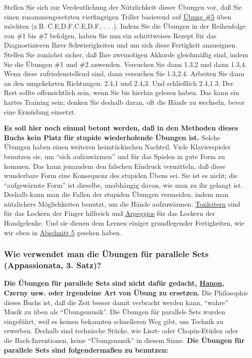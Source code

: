 Stellen Sie sich zur Verdeutlichung der Nützlichkeit dieser Übungen vor, daß Sie einen zusammengesetzten vierfingrigen Triller basierend auf \hyperref[c1iii7b5]{Übung \#5} üben möchten (z.B. C.E,D.F,C.E,D.F, . . .).
Indem Sie die Übungen in der Reihenfolge von \#1 bis \#7 befolgen, haben Sie nun ein schrittweises Rezept für das Diagnostizieren Ihrer Schwierigkeiten und um sich diese Fertigkeit anzueignen.
Stellen Sie zunächst sicher, daß Ihre zweinotigen Akkorde gleichmäßig sind, indem Sie die Übungen \#1 und \#2 anwenden.
Versuchen Sie dann 1.3,2 und dann 1.3,4.
Wenn diese zufriedenstellend sind, dann versuchen Sie 1.3,2.4.
Arbeiten Sie dann an den umgekehrten Richtungen: 2.4,1 und 2.4,3. Und schließlich 2.4,1.3.
Der Rest sollte offensichtlich sein, wenn Sie bis hierhin gelesen haben.
Das kann ein hartes Training sein; denken Sie deshalb daran, oft die Hände zu wechseln, bevor eine Ermüdung einsetzt.

\textbf{Es soll hier noch einmal betont werden, daß in den Methoden dieses Buchs kein Platz für stupide wiederholende Übungen ist.}
Solche Übungen haben einen weiteren heimtückischen Nachteil.
Viele Klavierspieler benutzen sie, um \enquote{sich aufzuwärmen} und für das Spielen in gute Form zu kommen.
Das kann jemandem den falschen Eindruck vermitteln, daß diese wunderbare Form eine Konsequenz des stupiden Übens sei.
Sie ist es nicht; die \enquote{aufgewärmte Form} ist dieselbe, unabhängig davon, wie man zu ihr gelangt ist.
Deshalb kann man die Fallen der stupiden Übungen vermeiden, indem man nützlichere Möglichkeiten benutzt, um die Hände aufzuwärmen.
\hyperref[c1iii5a]{Tonleitern} sind für das Lockern der Finger hilfreich und \hyperref[c1iii5e]{Arpeggios} für das Lockern der Handgelenke.
Und sie dienen dem Lernen einiger grundlegender Fertigkeiten, wie wir oben in \hyperref[c1iii5]{Abschnitt 5} gesehen haben.


\subsubsection{Wie verwendet man die Übungen für parallele Sets (Appassionata, 3. Satz)?}
\label{c1iii7c}

\textbf{Die Übungen für parallele Sets sind nicht dafür gedacht, \hyperref[c1iii7h]{Hanon}, Czerny usw. oder irgendeine Art von Übung zu ersetzen.}
Die Philosophie dieses Buchs ist, daß die Zeit besser damit verbracht werden kann, \enquote{wahre} Musik zu üben als \enquote{Übungsmusik}.
Die Übungen für parallele Sets wurden eingeführt, weil es keinen bekannten schnelleren Weg gibt, um Technik zu erwerben.
Deshalb sind technische Stücke, wie Liszt- oder Chopin-Etüden oder die Bach-Inventionen, keine \enquote{Übungsmusik} in diesem Sinne.
\textbf{Die Übungen für parallele Sets sind folgendermaßen zu benutzen:}

